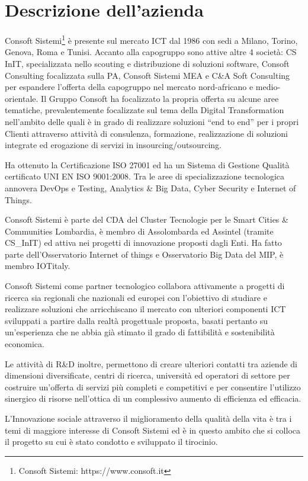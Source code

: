 \section{Descrizione dell'azienda}
Consoft Sistemi\footnote{Consoft Sistemi: https://www.consoft.it} è presente sul mercato ICT dal 1986 con sedi a Milano, Torino, Genova, Roma e Tunisi.
Accanto alla capogruppo sono attive altre 4 società: CS InIT, specializzata nello scouting e distribuzione di soluzioni software, Consoft Consulting 
focalizzata sulla PA, Consoft Sistemi MEA e C\&A Soft Consulting per espandere l’offerta della capogruppo nel mercato nord-africano e medio-orientale. 
Il Gruppo Consoft ha focalizzato la propria offerta su alcune aree tematiche, prevalentemente focalizzate sul tema della Digital Transformation nell’ambito
delle quali è in grado di realizzare soluzioni “end to end” per i propri Clienti attraverso attività di consulenza, formazione, realizzazione di soluzioni
integrate ed erogazione di servizi in insourcing/outsourcing.

Ha ottenuto la Certificazione ISO 27001 ed ha un Sistema di Gestione Qualità certificato UNI EN ISO 9001:2008.
Tra le aree di specializzazione tecnologica
annovera DevOps e Testing, Analytics \& Big Data, Cyber Security e Internet of Things.

Consoft Sistemi è parte del CDA del Cluster Tecnologie
per le Smart Cities \& Communities Lombardia, è membro di Assolombarda ed Assintel
(tramite CS\_InIT) ed attiva nei progetti di innovazione proposti dagli Enti.
Ha fatto parte dell’Osservatorio Internet of things e Osservatorio Big Data del MIP, è membro IOTitaly.

Consoft Sistemi come partner tecnologico collabora attivamente a progetti di ricerca sia regionali che nazionali
ed europei con l’obiettivo di studiare e realizzare soluzioni che arricchiscano il mercato con ulteriori
componenti ICT sviluppati a partire dalla realtà progettuale proposta,
basati pertanto su un'esperienza che ne abbia già stimato il grado di fattibilità e sostenibilità economica.

Le attività di R\&D inoltre, permettono di creare ulteriori contatti tra aziende di dimensioni diversificate, centri di ricerca,
università ed operatori di settore per costruire un’offerta di servizi più completi e competitivi e per consentire l’utilizzo sinergico di risorse
nell'ottica di un complessivo aumento di efficienza ed efficacia.

L’Innovazione sociale attraverso il miglioramento della qualità della vita è tra i temi di maggiore interesse di Consoft
Sistemi ed è in questo ambito
che si colloca il progetto su cui è stato condotto e sviluppato il tirocinio.

